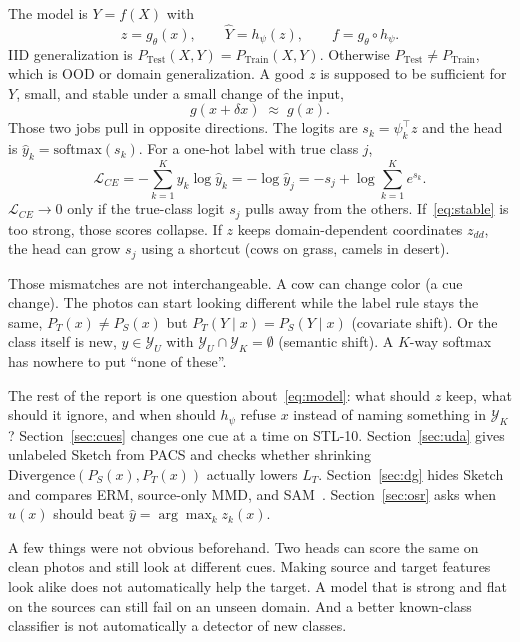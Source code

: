 \documentclass{article}
\begin{document}
The model is $Y=f(X)$ with
\begin{equation}
  z=g_\theta(x),\qquad \hat Y=h_\psi(z),\qquad f=g_\theta\circ h_\psi.
  \label{eq:model}
\end{equation}
IID generalization is $P_{\mathrm{Test}}(X,Y)=P_{\mathrm{Train}}(X,Y)$.
Otherwise $P_{\mathrm{Test}}\neq P_{\mathrm{Train}}$, which is OOD or domain generalization.
A good $z$ is supposed to be sufficient for $Y$, small, and stable under a small change of the input,
\begin{equation}
  g(x+\delta x)\;\approx\; g(x).
  \label{eq:stable}
\end{equation}
Those two jobs pull in opposite directions.
The logits are $s_k=\psi_k^\top z$ and the head is $\hat y_k=\mathrm{softmax}(s_k)$.
For a one-hot label with true class $j$,
\begin{equation}
  \mathcal{L}_{CE}
  =-\sum_{k=1}^{K} y_k\log\hat y_k
  =-\log\hat y_j
  =-s_j+\log\sum_{k=1}^{K}e^{s_k}.
  \label{eq:ce}
\end{equation}
$\mathcal{L}_{CE}\to 0$ only if the true-class logit $s_j$ pulls away from the others.
If~\eqref{eq:stable} is too strong, those scores collapse.
If $z$ keeps domain-dependent coordinates $z_{dd}$, the head can grow $s_j$ using a shortcut (cows on grass, camels in desert).

Those mismatches are not interchangeable.
A cow can change color (a cue change).
The photos can start looking different while the label rule stays the same,
$P_T(x)\neq P_S(x)$ but $P_T(Y\mid x)=P_S(Y\mid x)$ (covariate shift).
Or the class itself is new, $y\in\mathcal{Y}_U$ with $\mathcal{Y}_U\cap\mathcal{Y}_K=\emptyset$ (semantic shift).
A $K$-way softmax has nowhere to put ``none of these''.

The rest of the report is one question about~\eqref{eq:model}:
what should $z$ keep, what should it ignore, and when should $h_\psi$ refuse $x$ instead of naming something in $\mathcal{Y}_K$?
Section~\ref{sec:cues} changes one cue at a time on STL-10.
Section~\ref{sec:uda} gives unlabeled Sketch from PACS and checks whether shrinking $\mathrm{Divergence}(P_S(x),P_T(x))$ actually lowers $L_T$.
Section~\ref{sec:dg} hides Sketch and compares ERM, source-only MMD, and SAM~\citep{foret2021sharpness}.
Section~\ref{sec:osr} asks when $u(x)$ should beat $\hat y=\arg\max_k z_k(x)$.

A few things were not obvious beforehand.
Two heads can score the same on clean photos and still look at different cues.
Making source and target features look alike does not automatically help the target.
A model that is strong and flat on the sources can still fail on an unseen domain.
And a better known-class classifier is not automatically a detector of new classes.
\end{document}
